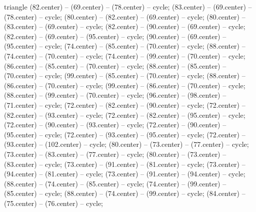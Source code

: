 \begin{pgfonlayer}{triangle}
 (82.center) -- (69.center) -- (78.center) -- cycle; 
 (83.center) -- (69.center) -- (78.center) -- cycle; 
 (80.center) -- (82.center) -- (69.center) -- cycle; 
 (80.center) -- (83.center) -- (69.center) -- cycle; 
 (82.center) -- (90.center) -- (69.center) -- cycle; 
 (82.center) -- (69.center) -- (95.center) -- cycle; 
 (90.center) -- (69.center) -- (95.center) -- cycle; 
 (74.center) -- (85.center) -- (70.center) -- cycle; 
 (88.center) -- (74.center) -- (70.center) -- cycle; 
 (74.center) -- (99.center) -- (70.center) -- cycle; 
 (86.center) -- (85.center) -- (70.center) -- cycle; 
 (88.center) -- (85.center) -- (70.center) -- cycle; 
 (99.center) -- (85.center) -- (70.center) -- cycle; 
 (88.center) -- (86.center) -- (70.center) -- cycle; 
 (99.center) -- (86.center) -- (70.center) -- cycle; 
 (88.center) -- (99.center) -- (70.center) -- cycle; 
 (96.center) -- (98.center) -- (71.center) -- cycle; 
 (72.center) -- (82.center) -- (90.center) -- cycle; 
 (72.center) -- (82.center) -- (93.center) -- cycle; 
 (72.center) -- (82.center) -- (95.center) -- cycle; 
 (72.center) -- (90.center) -- (93.center) -- cycle; 
 (72.center) -- (90.center) -- (95.center) -- cycle; 
 (72.center) -- (93.center) -- (95.center) -- cycle; 
 (72.center) -- (93.center) -- (102.center) -- cycle; 
 (80.center) -- (73.center) -- (77.center) -- cycle; 
 (73.center) -- (83.center) -- (77.center) -- cycle; 
 (80.center) -- (73.center) -- (83.center) -- cycle; 
 (73.center) -- (91.center) -- (81.center) -- cycle; 
 (73.center) -- (94.center) -- (81.center) -- cycle; 
 (73.center) -- (91.center) -- (94.center) -- cycle; 
 (88.center) -- (74.center) -- (85.center) -- cycle; 
 (74.center) -- (99.center) -- (85.center) -- cycle; 
 (88.center) -- (74.center) -- (99.center) -- cycle; 
 (84.center) -- (75.center) -- (76.center) -- cycle; 

\end{pgfonlayer}
